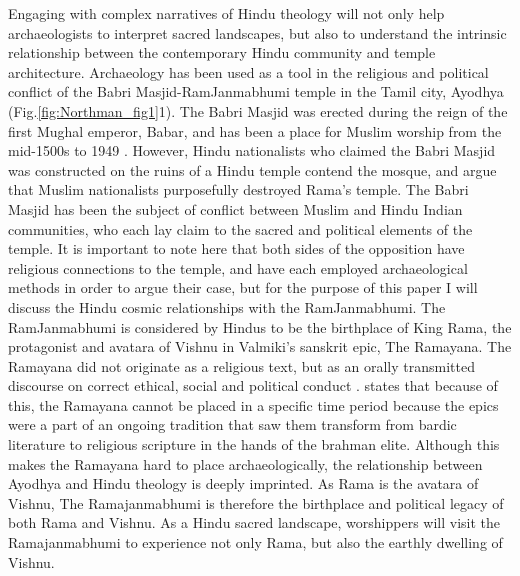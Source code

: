 	 Engaging with complex narratives of Hindu theology will not only help archaeologists to interpret sacred landscapes, but also to understand the intrinsic relationship between the contemporary Hindu community and temple architecture. Archaeology has been used as a tool in the religious and political conflict of the Babri Masjid-RamJanmabhumi temple in the Tamil city, Ayodhya (Fig.\ref {fig:Northman_fig1}1). The Babri Masjid was erected during the reign of the first Mughal emperor, Babar, and has been a place for Muslim worship from the mid-1500s to 1949 \parencite [156] {Rao_1994}. However, Hindu nationalists who claimed the Babri Masjid was constructed on the ruins of a Hindu temple contend the mosque, and argue that Muslim nationalists purposefully destroyed Rama’s temple. The Babri Masjid has been the subject of conflict between Muslim and Hindu Indian communities, who each lay claim to the sacred and political elements of the temple. It is important to note here that both sides of the opposition have religious connections to the temple, and have each employed archaeological methods in order to argue their case, but for the purpose of this paper I will discuss the Hindu cosmic relationships with the RamJanmabhumi. The RamJanmabhumi is considered by Hindus to be the birthplace of King Rama, the protagonist and avatara of Vishnu in Valmiki’s sanskrit epic, The Ramayana. The Ramayana did not originate as a religious text, but as an orally transmitted discourse on correct ethical, social and political conduct \parencite[141] {Thapar_1991}. \textcite [143] {Thapar_1991} states that because of this, the Ramayana cannot be placed in a specific time period because the epics were a part of an ongoing tradition that saw them transform from bardic literature to religious scripture in the hands of the brahman elite. Although this makes the Ramayana hard to place archaeologically, the relationship between Ayodhya and Hindu theology is deeply imprinted. As Rama is the avatara of Vishnu, The Ramajanmabhumi is therefore the birthplace and political legacy of both Rama and Vishnu. As a Hindu sacred landscape, worshippers will visit the Ramajanmabhumi to experience not only Rama, but also the earthly dwelling of Vishnu.

